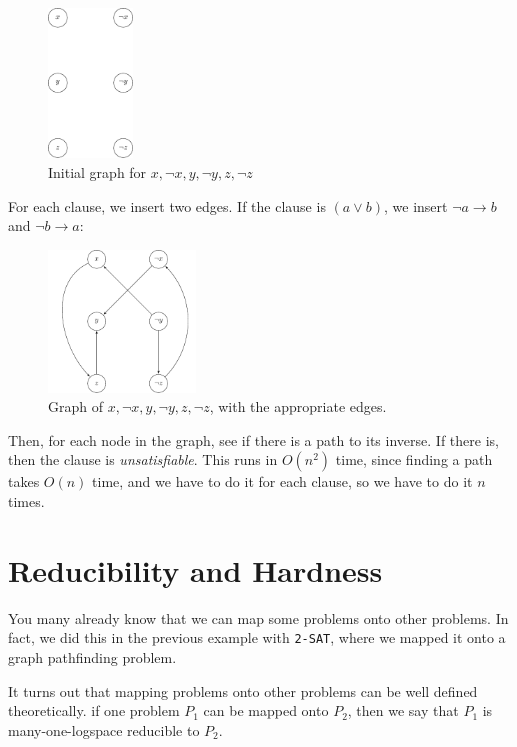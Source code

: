 \begin{figure}[H]
  \centering
  \includegraphics[width=0.2\textwidth]{diagrams/graph9}
  \caption{Initial graph for $x, \neg x, y, \neg y, z, \neg z$}
  \label{fig:graph-9}
\end{figure}

For each clause, we insert two edges. If the clause is $(a \vee b)$, we insert
$\neg a \rightarrow b$ and $\neg b \rightarrow a$:

\begin{figure}[H]
  \centering
  \includegraphics[width=0.35\textwidth]{diagrams/graph10}
  \caption{Graph of $x, \neg x, y, \neg y, z, \neg z$, with the appropriate
  edges.}
  \label{fig:graph-10}
\end{figure}

Then, for each node in the graph, see if there is a path to its inverse. If
there is, then the clause is \textit{unsatisfiable}. This runs in $O(n^2)$ time,
since finding a path takes $O(n)$ time, and we have to do it for each clause, so
we have to do it $n$ times.

\section{Reducibility and Hardness}
\label{sec:reduce-and-hard}

You many already know that we can map some problems onto other problems. In
fact, we did this in the previous example with \texttt{2-SAT}, where we mapped
it onto a graph pathfinding problem.

It turns out that mapping problems onto other problems can be well defined
theoretically. if one problem $P_1$ can be mapped onto $P_2$, then we say that
$P_1$ is many-one-logspace reducible to $P_2$.

